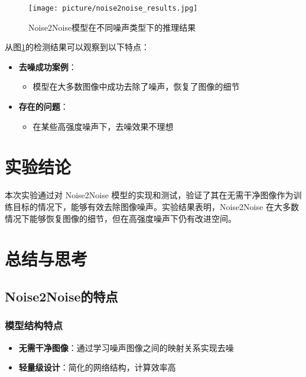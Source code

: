 \documentclass[UTF8]{ctexart}
\begin{document}
\begin{figure}[htbp]
    \centering
    \texttt{[image: picture/noise2noise\_results.jpg]}
    \caption{Noise2Noise模型在不同噪声类型下的推理结果}
    \label{fig:detection_results}
\end{figure}

从图\ref{fig:detection_results}的检测结果可以观察到以下特点：

\begin{itemize}
    \item \textbf{去噪成功案例}：
    \begin{itemize}
        \item 模型在大多数图像中成功去除了噪声，恢复了图像的细节
    \end{itemize}
    
    \item \textbf{存在的问题}：
    \begin{itemize}
        \item 在某些高强度噪声下，去噪效果不理想
    \end{itemize}
\end{itemize}

\section{实验结论}

本次实验通过对 Noise2Noise 模型的实现和测试，验证了其在无需干净图像作为训练目标的情况下，能够有效去除图像噪声。实验结果表明，Noise2Noise 在大多数情况下能够恢复图像的细节，但在高强度噪声下仍有改进空间。

\section{总结与思考}

\subsection{Noise2Noise的特点}

\subsubsection{模型结构特点}
\begin{itemize}
    \item \textbf{无需干净图像}：通过学习噪声图像之间的映射关系实现去噪
    \item \textbf{轻量级设计}：简化的网络结构，计算效率高
\end{itemize}
\end{document}
